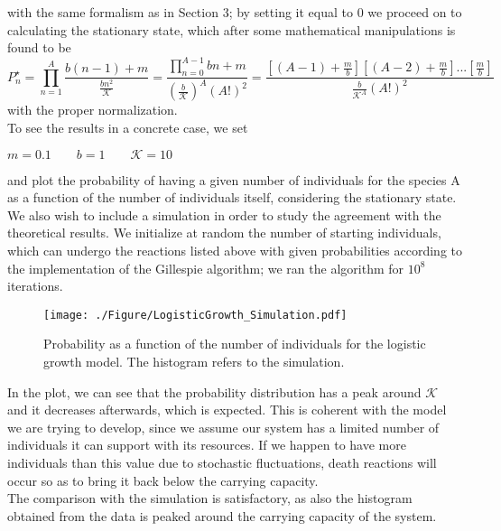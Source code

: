 \documentclass[a4paper,11pt]{article}
\begin{document}
with the same formalism as in Section 3; by setting it equal to 0 we proceed on to calculating the stationary state, which after some mathematical manipulations is found to be 
\begin{equation}
P_n^{\star} = \prod_{n=1}^{A}\frac{b(n-1)+m}{\frac{bn^2}{\mathcal{K}}} = \frac{\prod_{n=0}^{A-1} bn+m}{(\frac{b}{\mathcal{K}})^A(A!)^2} = \frac{[(A-1) + \frac{m}{b}][(A-2) + \frac{m}{b}]...[ \frac{m}{b}]}{\frac{b}{\mathcal{K}^A}(A!)^2}
\end{equation}
with the proper normalization.
\\
To see the results in a concrete case, we set
\begin{center}
    $m=0.1 \qquad b=1 \qquad \mathcal{K} = 10$
\end{center}

and plot the probability of having a given number of individuals for the species A as a function of the number of individuals itself, considering the stationary state.
\\
We also wish to include a simulation in order to study the agreement with the theoretical results. We initialize at random the number of starting individuals, which can undergo the reactions listed above with given probabilities according to the implementation of the Gillespie algorithm; we ran the algorithm for $10^8$ iterations.

\begin{figure}[htp]
    \centering
    \texttt{[image: ./Figure/LogisticGrowth\_Simulation.pdf]}
    \caption{Probability as a function of the number of individuals for the logistic growth model. The histogram refers to the simulation.}
    \label{fig:LG}
\end{figure}


In the plot, we can see that the probability distribution has a peak around $\mathcal{K}$ and it decreases afterwards, which is expected. This is coherent with the model we are trying to develop, since we assume our system has a limited number of individuals it can support with its resources. If we happen to have more individuals than this value due to stochastic fluctuations, death reactions will occur so as to bring it back below the carrying capacity.
\\ 
The comparison with the simulation is satisfactory, as also the histogram obtained from the data is peaked around the carrying capacity of the system.
\end{document}
